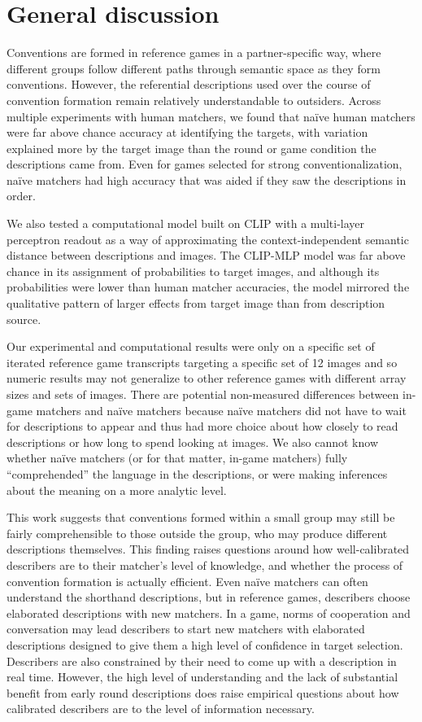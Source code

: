 \documentclass[10pt, letterpaper]{article}
\begin{document}
\section{General discussion}\label{general-discussion}

Conventions are formed in reference games in a partner-specific way,
where different groups follow different paths through semantic space as
they form conventions. However, the referential descriptions used over
the course of convention formation remain relatively understandable to
outsiders. Across multiple experiments with human matchers, we found
that naïve human matchers were far above chance accuracy at identifying
the targets, with variation explained more by the target image than the
round or game condition the descriptions came from. Even for games
selected for strong conventionalization, naïve matchers had high
accuracy that was aided if they saw the descriptions in order.

We also tested a computational model built on CLIP with a multi-layer
perceptron readout as a way of approximating the context-independent
semantic distance between descriptions and images. The CLIP-MLP model
was far above chance in its assignment of probabilities to target
images, and although its probabilities were lower than human matcher
accuracies, the model mirrored the qualitative pattern of larger effects
from target image than from description source.

Our experimental and computational results were only on a specific set
of iterated reference game transcripts targeting a specific set of 12
images and so numeric results may not generalize to other reference
games with different array sizes and sets of images. There are potential
non-measured differences between in-game matchers and naïve matchers
because naïve matchers did not have to wait for descriptions to appear
and thus had more choice about how closely to read descriptions or how
long to spend looking at images. We also cannot know whether naïve
matchers (or for that matter, in-game matchers) fully ``comprehended''
the language in the descriptions, or were making inferences about the
meaning on a more analytic level.

This work suggests that conventions formed within a small group may
still be fairly comprehensible to those outside the group, who may
produce different descriptions themselves. This finding raises questions
around how well-calibrated describers are to their matcher's level of
knowledge, and whether the process of convention formation is actually
efficient. Even naïve matchers can often understand the shorthand
descriptions, but in reference games, describers choose elaborated
descriptions with new matchers. In a game, norms of cooperation and
conversation may lead describers to start new matchers with elaborated
descriptions designed to give them a high level of confidence in target
selection. Describers are also constrained by their need to come up with
a description in real time. However, the high level of understanding and
the lack of substantial benefit from early round descriptions does raise
empirical questions about how calibrated describers are to the level of
information necessary.
\end{document}
